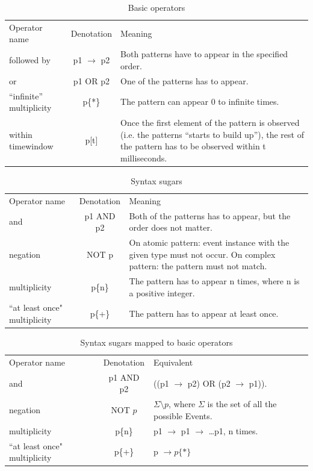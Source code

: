 		\begin{table}
		\caption{Basic operators}		
		\label{tab:cep:veplop}
		\begin{tabular}{lcm{6cm}}
		\centering
		Operator name &	Denotation & Meaning \\
		followed by & p1 $\rightarrow$ p2 & Both patterns have to appear in the specified order. \\
		or &	p1 OR p2 &	One of the patterns has to appear. \\
		``infinite'' multiplicity &	p\{*\} &	The pattern can appear 0 to infinite times. \\
		within timewindow &	p[t] &	Once the first element of the pattern is observed (i.e. the patterns ``starts to build up''), the rest of the pattern has to be observed within t milliseconds.
		\end{tabular}
		\end{table}

		\begin{table}
		\caption{Syntax sugars}		
		\label{tab:cep:veplsugar}
		\begin{tabular}{lcm{6cm}}
		\centering
		Operator name &	Denotation & Meaning \\
		and &	p1 AND p2 &	Both of the patterns has to appear, but the order does not matter.\\
		negation &	NOT p &	On atomic pattern: event instance with the given type must not occur. On complex pattern: the pattern must not match. \\
		multiplicity &	p\{n\} &	The pattern has to appear n times, where n is a positive integer.\\
		``at least once" multiplicity &	p\{+\} &	The pattern has to appear at least once. \\
		\end{tabular}
		\end{table}
		
		\begin{table}
		\caption{Syntax sugars mapped to basic operators}		
		\label{tab:cep:veplsugartobasic}
		\begin{tabular}{lcm{6cm}}
		\centering
		Operator name &	Denotation & Equivalent \\
		and &	p1 AND p2 & ((p1 $\rightarrow$ p2) OR (p2 $\rightarrow$ p1)). \\
		negation &	NOT $p$ & $\Sigma \setminus p$, where $\Sigma$ is the set of all the possible Events. \\
		multiplicity &	p\{n\} &	p1 $\rightarrow$ p1 $\rightarrow$ \dots p1, n times. \\
		``at least once" multiplicity &	p\{+\} & p $\rightarrow p\{\ast\}$ \\
		\end{tabular}
		\end{table}

